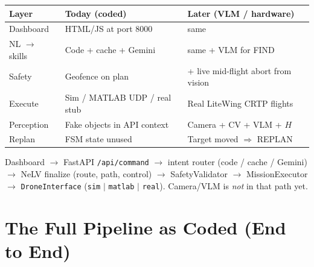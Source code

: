 \documentclass[11pt,a4paper]{article}
\begin{document}
\begin{center}
\small
\begin{tabular}{p{4.2cm}p{5.5cm}p{5.5cm}}
\toprule
\textbf{Layer} & \textbf{Today (coded)} & \textbf{Later (VLM / hardware)} \\
\midrule
Dashboard & HTML/JS at port 8000 & same \\
NL $\to$ skills & Code + cache + Gemini & same + VLM for FIND \\
Safety & Geofence on plan & + live mid-flight abort from vision \\
Execute & Sim / MATLAB UDP / real stub & Real LiteWing CRTP flights \\
Perception & Fake objects in API context & Camera + CV + VLM + $H$ \\
Replan & FSM state unused & Target moved $\Rightarrow$ REPLAN \\
\bottomrule
\end{tabular}
\end{center}

\begin{keyidea}[title={\textbf{Memorize the honest pipeline today}}]
Dashboard $\to$ FastAPI \texttt{/api/command} $\to$ intent router (code / cache / Gemini)
$\to$ NeLV finalize (route, path, control) $\to$ SafetyValidator $\to$ MissionExecutor
$\to$ \texttt{DroneInterface} (\texttt{sim} $|$ \texttt{matlab} $|$ \texttt{real}).
Camera/VLM is \emph{not} in that path yet.
\end{keyidea}

\section{The Full Pipeline as Coded (End to End)}
\end{document}
